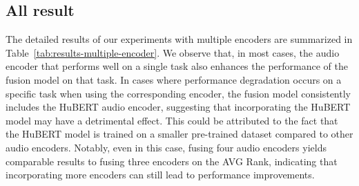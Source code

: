 \subsection{All result}

The detailed results of our experiments with multiple encoders are summarized in Table~\ref{tab:results-multiple-encoder}. We observe that, in most cases, the audio encoder that performs well on a single task also enhances the performance of the fusion model on that task. In cases where performance degradation occurs on a specific task when using the corresponding encoder, the fusion model consistently includes the HuBERT audio encoder, suggesting that incorporating the HuBERT model may have a detrimental effect. This could be attributed to the fact that the HuBERT model is trained on a smaller pre-trained dataset compared to other audio encoders. Notably, even in this case, fusing four audio encoders yields comparable results to fusing three encoders on the AVG Rank, indicating that incorporating more encoders can still lead to performance improvements.

